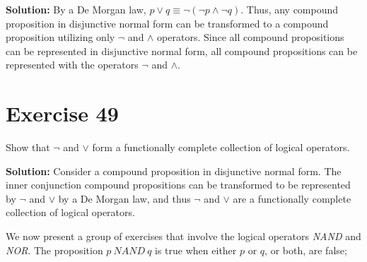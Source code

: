 \documentclass{Axon}
\begin{document}
\noindent
\textbf{Solution:}
By a De Morgan law, \(p \lor q \equiv \lnot( \lnot p \land \lnot q)\). Thus, any compound proposition in disjunctive normal form can be transformed to a compound proposition utilizing only \(\lnot\) and \(\land\) operators. Since all compound propositions can be represented in disjunctive normal form, all compound propositions can be represented with the operators \(\lnot\) and \(\land\).

\section*{Exercise 49}
Show that \(\lnot\) and \(\lor\) form a functionally complete collection of logical operators.

\noindent
\textbf{Solution:}
Consider a compound proposition in disjunctive normal form. The inner conjunction compound propositions can be transformed to be represented by \(\lnot\) and \(\lor\) by a De Morgan law, and thus \(\lnot\) and \(\lor\) are a functionally complete collection of logical operators.

We now present a group of exercises that involve the logical operators \textit{NAND} and \textit{NOR}. The proposition \(p \ \textit{NAND} \ q\) is true when either \(p\) or \(q\), or both, are false;

\printbibliography
\end{document}
